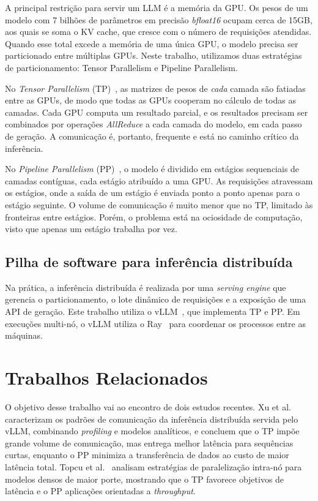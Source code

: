 \documentclass[manuscript,screen]{acmart}
\begin{document}
A principal restrição para servir um LLM é a memória da GPU. Os pesos de um modelo com 7 bilhões de parâmetros em precisão \textit{bfloat16} ocupam cerca de 15GB, aos quais se soma o KV cache, que cresce com o número de requisições atendidas. Quando esse total excede a memória de uma única GPU, o modelo precisa ser particionado entre múltiplas GPUs. Neste trabalho, utilizamos duas estratégias de particionamento: Tensor Parallelism e Pipeline Parallelism.

No \textit{Tensor Parallelism} (TP)~\cite{SHOEYBI2019}, as matrizes de pesos de \emph{cada} camada são fatiadas entre as GPUs, de modo que todas as GPUs cooperam no cálculo de todas as camadas. Cada GPU computa um resultado parcial, e os resultados precisam ser combinados por operações \textit{AllReduce} a cada camada do modelo, em cada passo de geração. A comunicação é, portanto, frequente e está no caminho crítico da inferência.

No \textit{Pipeline Parallelism} (PP)~\cite{HUANG2019}, o modelo é dividido em estágios sequenciais de camadas contíguas, cada estágio atribuído a uma GPU. As requisições atravessam os estágios, onde a saída de um estágio é enviada ponto a ponto apenas para o estágio seguinte. O volume de comunicação é muito menor que no TP, limitado às fronteiras entre estágios. Porém, o problema está na ociosidade de computação, visto que apenas um estágio trabalha por vez.

\subsection{Pilha de software para inferência distribuída}
\label{sec:stack}
Na prática, a inferência distribuída é realizada por uma \textit{serving engine} que gerencia o particionamento, o lote dinâmico de requisições e a exposição de uma API de geração. Este trabalho utiliza o vLLM~\cite{KWON2023}, que implementa TP e PP. Em execuções multi-nó, o vLLM utiliza o Ray~\cite{MORITZ2018} para coordenar os processos entre as máquinas.


\section{Trabalhos Relacionados}

O objetivo desse trabalho vai ao encontro de dois estudos recentes. Xu et al.~\cite{XU2025} caracterizam os padrões de comunicação da inferência distribuída servida pelo vLLM, combinando \textit{profiling} e modelos analíticos, e concluem que o TP impõe grande volume de comunicação, mas entrega melhor latência para sequências curtas, enquanto o PP minimiza a transferência de dados ao custo de maior latência total. Topcu et al.~\cite{TOPCU2026} analisam estratégias de paralelização intra-nó para modelos densos de maior porte, mostrando que o TP favorece objetivos de latência e o PP aplicações orientadas a \textit{throughput}.
\end{document}
